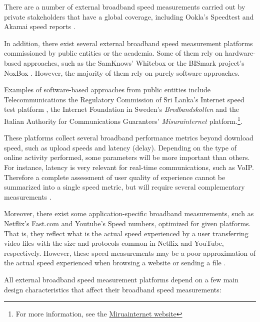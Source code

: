 \documentclass[12pt]{article}
\begin{document}
There are a number of external broadband speed measurements carried out by private stakeholders that have a global coverage, including Ookla's Speedtest and Akamai speed reports \citep{bauer2010,lehr2013,bauer2016}. 

In addition, there exist several external broadband speed measurement platforms commissioned by public entities or the academia. Some of them rely on hardware-based approaches, such as the SamKnows' Whitebox \citep{samknows2012,samknows2013} or the BISmark project's NoxBox \citep{sundaresan2012,sundaresan2014}. However, the majority of them rely on purely software approaches. 

Examples of software-based approaches from public entities include Telecommunications the Regulatory Commission of Sri Lanka's Internet speed test platform \citep{zuhyle2015}, the Internet Foundation in Sweden's \textit{Bredbandskollen} and the Italian Authority for Communications Guarantees' \textit{Misurainternet} platform.\footnote{For more information, see the \href{https://www.misurainternet.it/}{Miruainternet website}}.

These platforms collect several broadband performance metrics beyond download speed, such as upload speeds and latency (delay). Depending on the type of online activity performed, some parameters will be more important than others. For instance, latency is very relevant for real-time communications, such as VoIP. Therefore a complete assessment of user quality of experience cannot be summarized into a single speed metric, but will require several complementary measurements \citep{samknows2013,zuhyle2015}. 

Moreover, there exist some application-specific broadband measurements, such as Netflix's Fast.com and Youtube's Speed numbers, optimized for given platforms. That is, they reflect what is the actual speed experienced by a user transferring video files with the size and protocols common in Netflix and YouTube, respectively. However, these speed measurements may be a poor approximation of the actual speed experienced when browsing a website or sending a file \citep{bauer2010, bauer2016}.         

All external broadband speed measurement platforms depend on a few main design characteristics that affect their broadband speed measurements:
\end{document}

